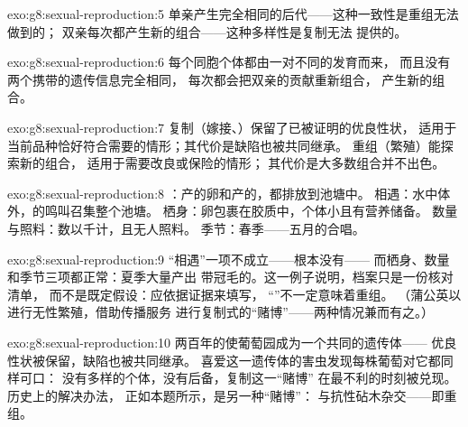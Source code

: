 \begin{solution}{exo:g8:sexual-reproduction:5}
单亲产生完全相同的后代——这种一致性是重组无法做到的；
双亲每次都产生新的组合——这种多样性是复制无法
提供的。
\end{solution}

\begin{solution}{exo:g8:sexual-reproduction:6}
每个同胞个体都由一对不同的发育而来，
而且没有两个携带的遗传信息完全相同，
每次都会把双亲的贡献重新组合，
产生新的组合。
\end{solution}

\begin{solution}{exo:g8:sexual-reproduction:7}
复制（嫁接、）保留了已被证明的优良性状，
适用于当前品种恰好符合需要的情形；其代价是缺陷也被共同继承。
重组（繁殖）能探索新的组合，
适用于需要改良或保险的情形；
其代价是大多数组合并不出色。
\end{solution}

\begin{solution}{exo:g8:sexual-reproduction:8}
：产的卵和产的，都排放到池塘中。
相遇：水中体外，的鸣叫召集整个池塘。
栖身：卵包裹在胶质中，个体小且有营养储备。
数量与照料：数以千计，且无人照料。
季节：春季——五月的合唱。
\end{solution}

\begin{solution}{exo:g8:sexual-reproduction:9}
“相遇”一项不成立——根本没有——
而栖身、数量和季节三项都正常：夏季大量产出
带冠毛的。这一例子说明，档案只是一份核对清单，
而不是既定假设：应依据证据来填写，
“”不一定意味着重组。
（蒲公英以进行无性繁殖，借助传播服务
进行复制式的“赌博”——两种情况兼而有之。）
\end{solution}

\begin{solution}{exo:g8:sexual-reproduction:10}
两百年的使葡萄园成为一个共同的遗传体——
优良性状被保留，缺陷也被共同继承。
喜爱这一遗传体的害虫发现每株葡萄对它都同样可口：
没有多样的个体，没有后备，复制这一“赌博”
在最不利的时刻被兑现。历史上的解决办法，
正如本题所示，是另一种“赌博”：
与抗性砧木杂交——即重组。
\end{solution}

